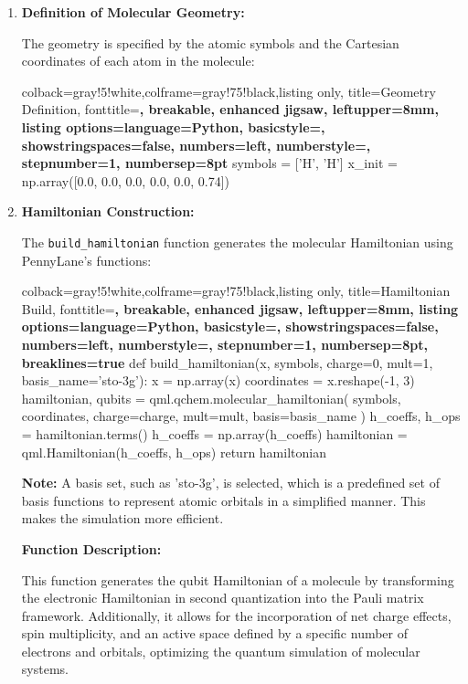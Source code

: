 \begin{enumerate}
    \item \textbf{Definition of Molecular Geometry:}
    
    The geometry is specified by the atomic symbols and the Cartesian coordinates of each atom in the molecule:
    
    \begin{tcblisting}{colback=gray!5!white,colframe=gray!75!black,listing only,
      title=Geometry Definition, fonttitle=\bfseries, breakable, enhanced jigsaw, leftupper=8mm,
      listing options={language=Python, basicstyle=\ttfamily\small,
      showstringspaces=false, numbers=left, numberstyle=\footnotesize, stepnumber=1, numbersep=8pt}}
symbols = ['H', 'H']
x_init = np.array([0.0, 0.0, 0.0, 0.0, 0.0, 0.74]) 
    \end{tcblisting}
    
    
    \item \textbf{Hamiltonian Construction:}
    
    The \texttt{build\_hamiltonian} function generates the molecular Hamiltonian using PennyLane's functions:
    
    \begin{tcblisting}{colback=gray!5!white,colframe=gray!75!black,listing only,
      title=Hamiltonian Build, fonttitle=\bfseries, breakable, enhanced jigsaw, leftupper=8mm,
      listing options={language=Python, basicstyle=\ttfamily\small,
      showstringspaces=false, numbers=left, numberstyle=\footnotesize, stepnumber=1, numbersep=8pt, breaklines=true}}
def build_hamiltonian(x, symbols, charge=0, mult=1, basis_name='sto-3g'):
    x = np.array(x)
    coordinates = x.reshape(-1, 3)
    hamiltonian, qubits = qml.qchem.molecular_hamiltonian(
        symbols, coordinates, charge=charge, mult=mult, basis=basis_name
    )
    h_coeffs, h_ops = hamiltonian.terms()
    h_coeffs = np.array(h_coeffs)
    hamiltonian = qml.Hamiltonian(h_coeffs, h_ops)
    return hamiltonian
    \end{tcblisting}
    \textbf{Note:}
    A basis set, such as 'sto-3g', is selected, which is a predefined set of basis functions to represent atomic orbitals in a simplified manner. This makes the simulation more efficient.
    
    \textbf{Function Description:}
    
    This function generates the qubit Hamiltonian of a molecule by transforming the electronic Hamiltonian in second quantization into the Pauli matrix framework. Additionally, it allows for the incorporation of net charge effects, spin multiplicity, and an active space defined by a specific number of electrons and orbitals, optimizing the quantum simulation of molecular systems.
    
\end{enumerate}

